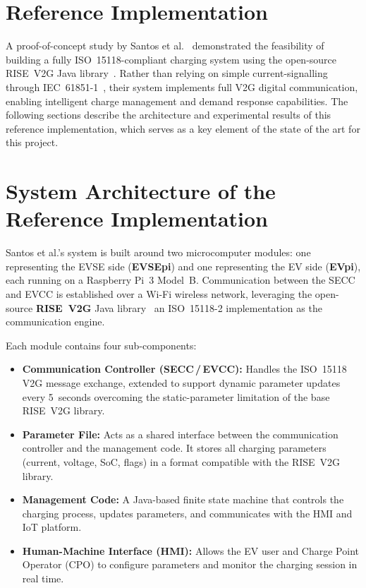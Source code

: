 \documentclass[12pt,a4paper]{report}
\begin{document}
\section{Reference Implementation}

A proof-of-concept study by Santos et al.~\autocite{santos2024} demonstrated the feasibility of
building a fully ISO~15118-compliant charging system using the open-source RISE~V2G Java
library~\autocite{rise_v2g}. Rather than relying on simple current-signalling through
IEC~61851-1~\autocite{iec61851_2017}, their system implements full V2G digital communication,
enabling intelligent charge management and demand response capabilities. The following sections
describe the architecture and experimental results of this reference implementation, which
serves as a key element of the state of the art for this project.

\section{System Architecture of the Reference Implementation}

Santos et al.'s system is built around two microcomputer modules: one representing the EVSE
side (\textbf{EVSEpi}) and one representing the EV side (\textbf{EVpi}), each running on a
Raspberry Pi~3 Model~B. Communication between the SECC and EVCC is established over a Wi-Fi
wireless network, leveraging the open-source \textbf{RISE~V2G} Java library~\autocite{rise_v2g}
 an ISO~15118-2 implementation as the communication engine.

Each module contains four sub-components:

\begin{itemize}
  \item \textbf{Communication Controller (SECC\,/\,EVCC):} Handles the ISO~15118 V2G message
        exchange, extended to support dynamic parameter updates every 5~seconds overcoming
        the static-parameter limitation of the base RISE~V2G library.

  \item \textbf{Parameter File:} Acts as a shared interface between the communication
        controller and the management code. It stores all charging parameters (current,
        voltage, SoC, flags) in a format compatible with the RISE~V2G library.

  \item \textbf{Management Code:} A Java-based finite state machine that controls the charging
        process, updates parameters, and communicates with the HMI and IoT platform.

  \item \textbf{Human-Machine Interface (HMI):} Allows the EV user and Charge Point Operator
        (CPO) to configure parameters and monitor the charging session in real time.
\end{itemize}
\end{document}
